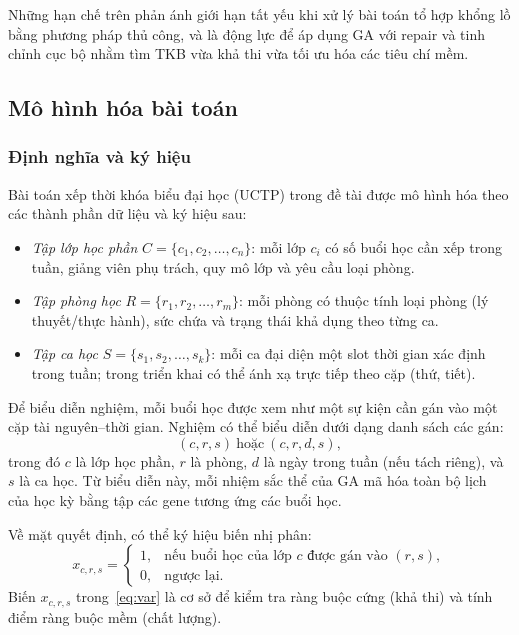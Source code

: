\documentclass[a4paper,12pt,oneside]{article}
\begin{document}
	Những hạn chế trên phản ánh giới hạn tất yếu khi xử lý bài toán tổ hợp khổng lồ bằng phương pháp thủ công, và là động lực để áp dụng GA với repair và tinh chỉnh cục bộ nhằm tìm TKB vừa khả thi vừa tối ưu hóa các tiêu chí mềm.
	
	\subsection{Mô hình hóa bài toán}
	
	\subsubsection{Định nghĩa và ký hiệu}
	
	Bài toán xếp thời khóa biểu đại học (UCTP) trong đề tài được mô hình hóa theo các thành phần dữ liệu và ký hiệu sau:
	\begin{itemize}
		\item \textit{Tập lớp học phần} $C=\{c_1,c_2,\ldots,c_n\}$: mỗi lớp $c_i$ có số buổi học cần xếp trong tuần, giảng viên phụ trách, quy mô lớp và yêu cầu loại phòng.
		\item \textit{Tập phòng học} $R=\{r_1,r_2,\ldots,r_m\}$: mỗi phòng có thuộc tính loại phòng (lý thuyết/thực hành), sức chứa và trạng thái khả dụng theo từng ca.
		\item \textit{Tập ca học} $S=\{s_1,s_2,\ldots,s_k\}$: mỗi ca đại diện một slot thời gian xác định trong tuần; trong triển khai có thể ánh xạ trực tiếp theo cặp (thứ, tiết).
	\end{itemize}
	
	Để biểu diễn nghiệm, mỗi buổi học được xem như một sự kiện cần gán vào một cặp tài nguyên--thời gian. Nghiệm có thể biểu diễn dưới dạng danh sách các gán:
	\[
	(c,r,s)\ \text{hoặc}\ (c,r,d,s),
	\]
	trong đó $c$ là lớp học phần, $r$ là phòng, $d$ là ngày trong tuần (nếu tách riêng), và $s$ là ca học. Từ biểu diễn này, mỗi nhiệm sắc thể của GA mã hóa toàn bộ lịch của học kỳ bằng tập các gene tương ứng các buổi học.
	
	Về mặt quyết định, có thể ký hiệu biến nhị phân:
	\begin{equation}
		\label{eq:var}
		x_{c,r,s}=
		\begin{cases}
			1, & \text{nếu buổi học của lớp } c \text{ được gán vào } (r,s),\\
			0, & \text{ngược lại.}
		\end{cases}
	\end{equation}
	Biến $x_{c,r,s}$ trong~\eqref{eq:var} là cơ sở để kiểm tra ràng buộc cứng (khả thi) và tính điểm ràng buộc mềm (chất lượng).
	
\end{document}
